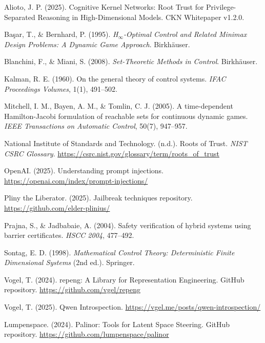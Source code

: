 \documentclass[11pt]{article}
\theoremstyle{definition}
\theoremstyle{plain}
\theoremstyle{remark}
\begin{document}
\begin{enumerate}[leftmargin=2em, label={[\arabic*]}]

\item Alioto, J. P. (2025). Cognitive Kernel Networks: Root Trust for Privilege-Separated Reasoning in High-Dimensional Models. CKN Whitepaper v1.2.0.

\item Ba\c{s}ar, T., \& Bernhard, P. (1995). \emph{H$_\infty$-Optimal Control and Related Minimax Design Problems: A Dynamic Game Approach}. Birkh\"auser.

\item Blanchini, F., \& Miani, S. (2008). \emph{Set-Theoretic Methods in Control}. Birkh\"auser.

\item Kalman, R. E. (1960). On the general theory of control systems. \emph{IFAC Proceedings Volumes}, 1(1), 491--502.

\item Mitchell, I. M., Bayen, A. M., \& Tomlin, C. J. (2005). A time-dependent Hamilton-Jacobi formulation of reachable sets for continuous dynamic games. \emph{IEEE Transactions on Automatic Control}, 50(7), 947--957.

\item National Institute of Standards and Technology. (n.d.). Roots of Trust. \emph{NIST CSRC Glossary}. \url{https://csrc.nist.gov/glossary/term/roots_of_trust}

\item OpenAI. (2025). Understanding prompt injections. \url{https://openai.com/index/prompt-injections/}

\item Pliny the Liberator. (2025). Jailbreak techniques repository. \url{https://github.com/elder-plinius/}

\item Prajna, S., \& Jadbabaie, A. (2004). Safety verification of hybrid systems using barrier certificates. \emph{HSCC 2004}, 477--492.

\item Sontag, E. D. (1998). \emph{Mathematical Control Theory: Deterministic Finite Dimensional Systems} (2nd ed.). Springer.

\item Vogel, T. (2024). repeng: A Library for Representation Engineering. GitHub repository. \url{https://github.com/vgel/repeng}

\item Vogel, T. (2025). Qwen Introspection. \url{https://vgel.me/posts/qwen-introspection/}

\item Lumpenspace. (2024). Palinor: Tools for Latent Space Steering. GitHub repository. \url{https://github.com/lumpenspace/palinor}

\end{enumerate}
\end{document}
